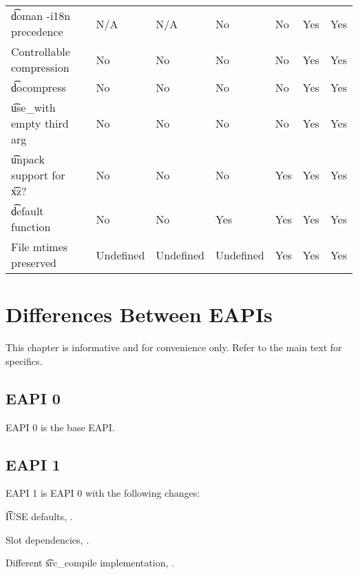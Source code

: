 \begin{landscape}
\begin{longtable}{llP{5em}P{5em}P{6em}P{6em}P{6em}P{6em}}
\t{doman -i18n} precedence &  &
    N/A & N/A & No & No & Yes & Yes \\

Controllable compression &  &
    No & No & No & No & Yes & Yes \\

\t{docompress} &  &
    No & No & No & No & Yes & Yes \\

\t{use\_with} empty third arg &  &
    No & No & No & No & Yes & Yes \\

\t{unpack} support for \t{xz}? &  &
    No & No & No & Yes & Yes & Yes \\

\t{default} function &  &
    No & No & Yes & Yes & Yes & Yes \\

File mtimes preserved &  &
    Undefined & Undefined & Undefined & Yes & Yes & Yes \\

\end{longtable}
\end{landscape}

\chapter{Differences Between EAPIs}

\note This chapter is informative and for convenience only. Refer to the main text for specifics.

\section*{EAPI 0}

EAPI 0 is the base EAPI.

\section*{EAPI 1}

EAPI 1 is EAPI 0 with the following changes:

\begin{compactitem}
\item \t{IUSE} defaults, .
\item Slot dependencies, .
\item Different \t{src\_compile} implementation, .
\end{compactitem}

